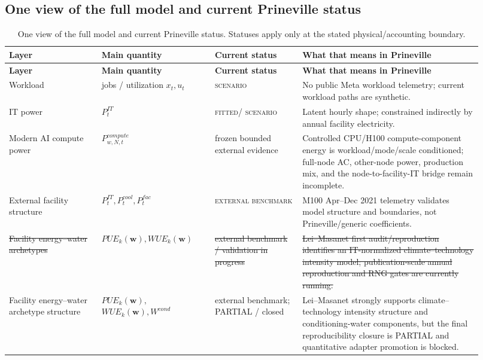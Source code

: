 \documentclass[11pt]{article}
\newcommand{\oldtxt}[1]{\textcolor{blue!70!black}{\sout{#1}}}
\newcommand{\newtxt}[1]{\textcolor{green!45!black}{#1}}
\newcommand{\latesttxt}[1]{\textcolor{purple!85!black}{#1}}
\newcommand{\Fitted}{\textsc{fitted}}
\newcommand{\Scenario}{\textsc{scenario}}
\newcommand{\Benchmark}{\textsc{external benchmark}}
\begin{document}
\subsection*{One view of the full model and current Prineville status}

\begingroup
\small
\begin{longtable}{@{}p{0.18\linewidth}p{0.22\linewidth}p{0.17\linewidth}p{0.35\linewidth}@{}}
\caption{\latesttxt{One view of the full model and current Prineville status. Statuses apply only at the stated physical/accounting boundary.}}\\
\toprule
\textbf{Layer} & \textbf{Main quantity} & \textbf{Current status} & \textbf{What that means in Prineville} \\
\midrule
\endfirsthead
\toprule
\textbf{Layer} & \textbf{Main quantity} & \textbf{Current status} & \textbf{What that means in Prineville} \\
\midrule
\endhead
Workload & jobs / utilization \(x_t,u_t\) & \Scenario & No public Meta workload telemetry; current workload paths are synthetic. \\
IT power & \(P^{IT}_t\) & \Fitted / \Scenario & Latent hourly shape; constrained indirectly by annual facility electricity. \\
\latesttxt{Modern AI compute power} & \latesttxt{\(P^{compute}_{w,N,t}\)} & \latesttxt{frozen bounded external evidence} & \latesttxt{Controlled CPU/H100 compute-component energy is workload/mode/scale conditioned; full-node AC, other-node power, production mix, and the node-to-facility-IT bridge remain incomplete.} \\
\newtxt{External facility structure} & \newtxt{\(P^{IT}_t,P^{cool}_t,P^{fac}_t\)} & \newtxt{\Benchmark} & \newtxt{M100 Apr--Dec 2021 telemetry validates model structure and boundaries, not Prineville/generic coefficients.} \\
\oldtxt{Facility energy--water archetypes} & \oldtxt{\(PUE_k(\mathbf w),WUE_k(\mathbf w)\)} & \oldtxt{external benchmark / validation in progress} & \oldtxt{Lei--Masanet first audit/reproduction identifies an IT-normalized climate--technology intensity model; publication-scale annual reproduction and RNG gates are currently running.} \\
\latesttxt{Facility energy--water archetype structure} & \latesttxt{\(PUE_k(\mathbf w),\)}\newline\latesttxt{\(WUE_k(\mathbf w),W^{cond}\)} & \latesttxt{external benchmark; PARTIAL / closed} & \latesttxt{Lei--Masanet strongly supports climate--technology intensity structure and conditioning-water components, but the final reproducibility closure is PARTIAL and quantitative adapter promotion is blocked.} \\

\end{longtable}
\end{document}
